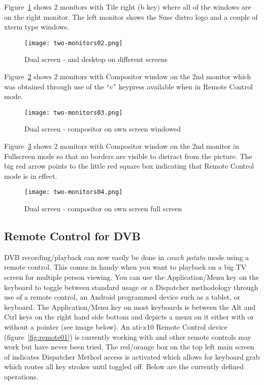 Figure~\ref{fig:two-monitors02} shows 2 monitors with Tile right (b key) where all of the \CGG{} windows are on the right monitor.  The left monitor shows the Suse distro logo and a couple of xterm type windows.

\begin{figure}[htpb]
    \centering
    \texttt{[image: two-monitors02.png]}
    \caption{Dual screen - \CGG{} and desktop on different screens}
    \label{fig:two-monitors02}
\end{figure}

Figure~\ref{fig:two-monitors03} shows 2 monitors with Compositor window on the 2nd monitor which was obtained through use of the “c” keypress available when in Remote Control mode.

\begin{figure}[htpb]
    \centering
    \texttt{[image: two-monitors03.png]}
    \caption{Dual screen - \CGG{} compositor on own screen windowed}
    \label{fig:two-monitors03}
\end{figure}

Figure~\ref{fig:two-monitors04} shows 2 monitors with Compositor window on the 2nd monitor in Fullscreen mode so that no \CGG{} borders are visible to distract from the picture.  The big red arrow points to the little red square box indicating that Remote Control mode is in effect.

\begin{figure}[htpb]
    \centering
    \texttt{[image: two-monitors04.png]}
    \caption{Dual screen - \CGG{} compositor on own screen full screen}
    \label{fig:two-monitors04}
\end{figure}

\subsection{Remote Control for DVB}%
\label{sub:remote_control_dvb}

\CGG{} DVB recording/playback can now easily be done in \textit{couch potato} mode using a remote control.  This comes in handy when you want to playback on a big TV screen for multiple person viewing. You can use the Application/Menu key on the keyboard to toggle between standard \CGG{} usage or a Dispatcher methodology through use of a remote control, an Android programmed device such as a tablet, or keyboard. The Application/Menu key on most keyboards is between the Alt and Ctrl keys on the right hand side bottom and depicts a menu on it either with or without a pointer (see image below).  An ati-x10 Remote Control device (figure~\ref{fig:remote01}) is currently working with \CGG{} and other remote controls may work but have never been tried.  The red/orange box on the top left main screen of \CGG{}  indicates Dispatcher Method access is activated which allows for keyboard grab which routes all key strokes until toggled off.  Below are the currently defined operations.

